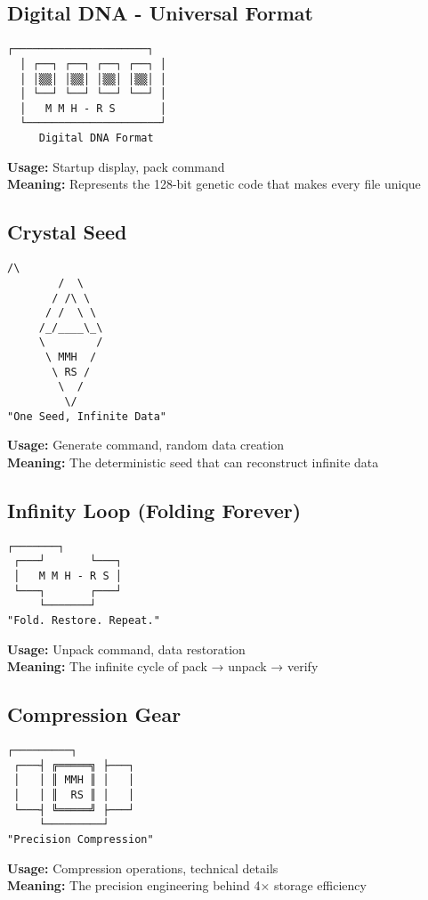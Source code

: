 \documentclass[11pt,a4paper]{article}
\begin{document}
	\subsection{Digital DNA - Universal Format}
	\begin{lstlisting}[basicstyle=\ttfamily\small]
  ┌─────────────────────┐
  │ ┌──┐ ┌──┐ ┌──┐ ┌──┐ │
  │ │▒▒│ │▒▒│ │▒▒│ │▒▒│ │
  │ └──┘ └──┘ └──┘ └──┘ │
  │   M M H - R S       │
  └─────────────────────┘
     Digital DNA Format
	\end{lstlisting}
	\textbf{Usage:} Startup display, pack command \\
	\textbf{Meaning:} Represents the 128-bit genetic code that makes every file unique

	\subsection{Crystal Seed}
	\begin{lstlisting}[basicstyle=\ttfamily\small]
         /\
        /  \
       / /\ \
      / /  \ \
     /_/____\_\
     \        /
      \ MMH  /
       \ RS /
        \  /
         \/
"One Seed, Infinite Data"
	\end{lstlisting}
	\textbf{Usage:} Generate command, random data creation \\
	\textbf{Meaning:} The deterministic seed that can reconstruct infinite data

	\subsection{Infinity Loop (Folding Forever)}
	\begin{lstlisting}[basicstyle=\ttfamily\small]
     ┌───────┐
 ┌───┘       └───┐
 │   M M H - R S │
 └───┐       ┌───┘
     └───────┘
"Fold. Restore. Repeat."
	\end{lstlisting}
	\textbf{Usage:} Unpack command, data restoration \\
	\textbf{Meaning:} The infinite cycle of pack → unpack → verify

	\subsection{Compression Gear}
	\begin{lstlisting}[basicstyle=\ttfamily\small]
     ┌─────────┐
 ┌───┤ ╔═════╗ ├───┐
 │   │ ║ MMH ║ │   │
 │   │ ║  RS ║ │   │
 └───┤ ╚═════╝ ├───┘
     └─────────┘
"Precision Compression"
	\end{lstlisting}
	\textbf{Usage:} Compression operations, technical details \\
	\textbf{Meaning:} The precision engineering behind 4× storage efficiency
\end{document}
